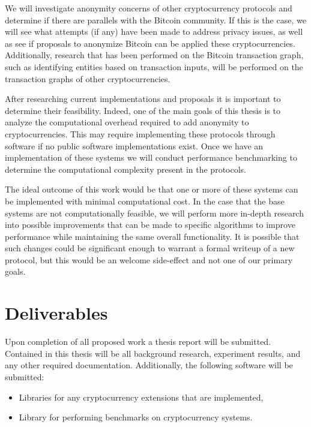 \documentclass[11pt]{article}
\begin{document}
We will investigate anonymity concerns of other cryptocurrency protocols and
determine if there are parallels with the Bitcoin community. If this is the
case, we will see what attempts (if any) have been made to address privacy
issues, as well as see if proposals to anonymize Bitcoin can be applied these
cryptocurrencies. Additionally, research that has been performed on the Bitcoin
transaction graph, such as identifying entities based on transaction inputs,
will be performed on the transaction graphs of other cryptocurrencies.

After researching current implementations and proposals it is important to
determine their feasibility. Indeed, one of the main goals of this thesis is to
analyze the computational overhead required to add anonymity to
cryptocurrencies. This may require implementing these protocols through software
if no public software implementations exist. Once we have an implementation of
these systems we will conduct performance benchmarking to determine the
computational complexity present in the protocols.

The ideal outcome of this work would be that one or more of these systems can be
implemented with minimal computational cost. In the case that the base
systems are not computationally feasible, we will perform more in-depth research
into possible improvements that can be made to specific algorithms to improve
performance while maintaining the same overall functionality. It is possible
that such changes could be significant enough to warrant a formal writeup of a
new protocol, but this would be an welcome side-effect and not one of our
primary goals.

\section{Deliverables}
Upon completion of all proposed work a thesis report will be submitted.
Contained in this thesis will be all background research, experiment results,
and any other required documentation. Additionally, the following software will
be submitted:
\begin{itemize}
    \item Libraries for any cryptocurrency extensions that are implemented,
    \item Library for performing benchmarks on cryptocurrency systems.
\end{itemize}
\end{document}
